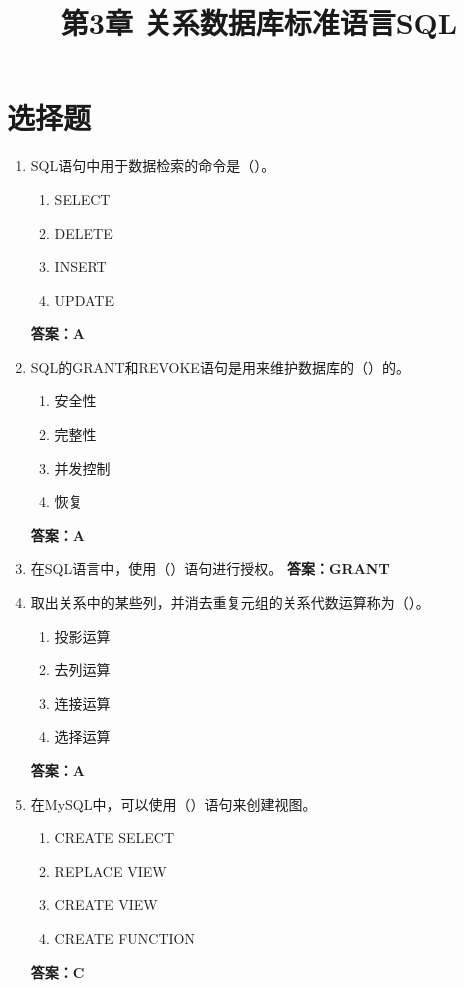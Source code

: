 \documentclass[12pt, a4paper]{article}
\title{\textbf{第3章 关系数据库标准语言SQL}}
\date{}
\begin{document}
\section{选择题}

\begin{enumerate}[label=\arabic*.]
	\item SQL语句中用于数据检索的命令是（\quad）。
	      \begin{enumerate}
		      \item SELECT
		      \item DELETE
		      \item INSERT
		      \item UPDATE
	      \end{enumerate}
	      \textbf{答案：A}

	\item SQL的GRANT和REVOKE语句是用来维护数据库的（\quad）的。
	      \begin{enumerate}
		      \item 安全性
		      \item 完整性
		      \item 并发控制
		      \item 恢复
	      \end{enumerate}
	      \textbf{答案：A}

	\item 在SQL语言中，使用（\quad）语句进行授权。
	      \textbf{答案：GRANT}

	\item 取出关系中的某些列，并消去重复元组的关系代数运算称为（\quad）。
	      \begin{enumerate}
		      \item 投影运算
		      \item 去列运算
		      \item 连接运算
		      \item 选择运算
	      \end{enumerate}
	      \textbf{答案：A}

	\item 在MySQL中，可以使用（\quad）语句来创建视图。
	      \begin{enumerate}
		      \item CREATE SELECT
		      \item REPLACE VIEW
		      \item CREATE VIEW
		      \item CREATE FUNCTION
	      \end{enumerate}
	      \textbf{答案：C}


\end{enumerate}
\end{document}
